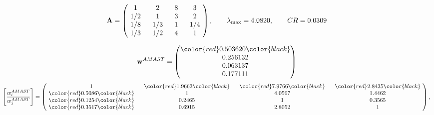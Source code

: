 \begin{example}
\begin{equation*}
\mathbf{A} =
\begin{pmatrix}
$\,\,$ 1 $\,\,$ & $\,\,$2$\,\,$ & $\,\,$8$\,\,$ & $\,\,$3 $\,\,$ \\
$\,\,$ 1/2$\,\,$ & $\,\,$ 1 $\,\,$ & $\,\,$3$\,\,$ & $\,\,$2 $\,\,$ \\
$\,\,$ 1/8$\,\,$ & $\,\,$ 1/3$\,\,$ & $\,\,$ 1 $\,\,$ & $\,\,$ 1/4 $\,\,$ \\
$\,\,$ 1/3$\,\,$ & $\,\,$ 1/2$\,\,$ & $\,\,$4$\,\,$ & $\,\,$ 1  $\,\,$ \\
\end{pmatrix},
\qquad
\lambda_{\max} =
4.0820,
\qquad
CR = 0.0309
\end{equation*}

\begin{equation*}
\mathbf{w}^{AMAST} =
\begin{pmatrix}
\color{red} 0.503620\color{black} \\
0.256132\\
0.063137\\
0.177111
\end{pmatrix}\end{equation*}
\begin{equation*}
\left[ \frac{{w}^{AMAST}_i}{{w}^{AMAST}_j} \right] =
\begin{pmatrix}
$\,\,$ 1 $\,\,$ & $\,\,$\color{red} 1.9663\color{black} $\,\,$ & $\,\,$\color{red} 7.9766\color{black} $\,\,$ & $\,\,$\color{red} 2.8435\color{black} $\,\,$ \\
$\,\,$\color{red} 0.5086\color{black} $\,\,$ & $\,\,$ 1 $\,\,$ & $\,\,$4.0567$\,\,$ & $\,\,$1.4462  $\,\,$ \\
$\,\,$\color{red} 0.1254\color{black} $\,\,$ & $\,\,$0.2465$\,\,$ & $\,\,$ 1 $\,\,$ & $\,\,$0.3565 $\,\,$ \\
$\,\,$\color{red} 0.3517\color{black} $\,\,$ & $\,\,$0.6915$\,\,$ & $\,\,$2.8052$\,\,$ & $\,\,$ 1  $\,\,$ \\
\end{pmatrix},
\end{equation*}


\end{example}
